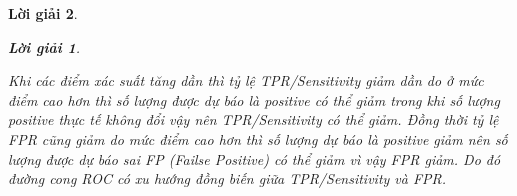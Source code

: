 \documentclass[14pt, a4paper]{article}
\theoremstyle{sltheorem}
\theoremstyle{soltheorem}
\newtheorem*{loigiai}{Lời giải}
\begin{document}
\begin{loigiai}
\begin{loigiai}
\begin{itemize}
            Khi các điểm xác suất tăng dần thì tỷ lệ TPR/Sensitivity giảm dần do ở mức điểm cao hơn thì số lượng được dự báo là positive có thể giảm trong khi số lượng positive thực tế không đổi vậy nên TPR/Sensitivity có thể giảm. 
            Đồng thời tỷ lệ FPR cũng giảm do mức điểm cao hơn thì số lượng dự báo là positive giảm nên số lượng được dự báo sai FP (Failse Positive) có thể giảm vì vậy FPR giảm.
            Do đó đường cong ROC có xu hướng đồng biến giữa TPR/Sensitivity và FPR.
        \end{itemize}
    \end{loigiai}
\end{loigiai}

\newpage
\printbibliography[title={TÀI LIỆU THAM KHẢO}]
\end{document}
